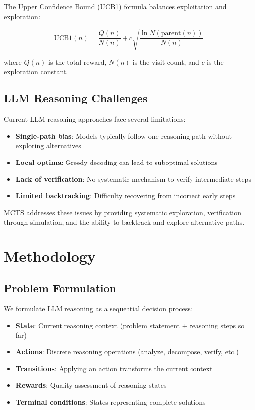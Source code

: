 \documentclass[conference]{IEEEtran}
\begin{document}
The Upper Confidence Bound (UCB1) formula balances exploitation and exploration:

\begin{equation}
\text{UCB1}(n) = \frac{Q(n)}{N(n)} + c \sqrt{\frac{\ln N(\text{parent}(n))}{N(n)}}
\end{equation}

where $Q(n)$ is the total reward, $N(n)$ is the visit count, and $c$ is the exploration constant.

\subsection{LLM Reasoning Challenges}

Current LLM reasoning approaches face several limitations:
\begin{itemize}
\item \textbf{Single-path bias}: Models typically follow one reasoning path without exploring alternatives
\item \textbf{Local optima}: Greedy decoding can lead to suboptimal solutions
\item \textbf{Lack of verification}: No systematic mechanism to verify intermediate steps
\item \textbf{Limited backtracking}: Difficulty recovering from incorrect early steps
\end{itemize}

MCTS addresses these issues by providing systematic exploration, verification through simulation, and the ability to backtrack and explore alternative paths.

\section{Methodology}

\subsection{Problem Formulation}

We formulate LLM reasoning as a sequential decision process:

\begin{itemize}
\item \textbf{State}: Current reasoning context (problem statement + reasoning steps so far)
\item \textbf{Actions}: Discrete reasoning operations (analyze, decompose, verify, etc.)
\item \textbf{Transitions}: Applying an action transforms the current context
\item \textbf{Rewards}: Quality assessment of reasoning states
\item \textbf{Terminal conditions}: States representing complete solutions
\end{itemize}
\end{document}
